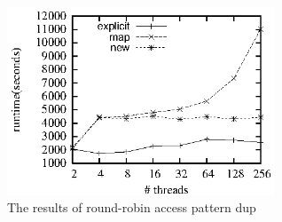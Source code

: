 \documentclass[preprint]{sigplanconf}
\begin{document}
\begin{figure}[ht!]
  \centering
  \includegraphics[width=80mm]{fig/rr.eps}
  \caption{The results of round-robin access pattern dup}
  \label{fig:rr_eval_dup}
\end{figure}
%
%

\end{document}

